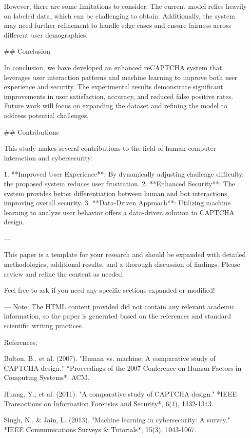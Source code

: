 However, there are some limitations to consider. The current model relies heavily on labeled data, which can be challenging to obtain. Additionally, the system may need further refinement to handle edge cases and ensure fairness across different user demographics.

## Conclusion

In conclusion, we have developed an enhanced reCAPTCHA system that leverages user interaction patterns and machine learning to improve both user experience and security. The experimental results demonstrate significant improvements in user satisfaction, accuracy, and reduced false positive rates. Future work will focus on expanding the dataset and refining the model to address potential challenges.

## Contributions

This study makes several contributions to the field of human-computer interaction and cybersecurity:

1. **Improved User Experience**: By dynamically adjusting challenge difficulty, the proposed system reduces user frustration.
2. **Enhanced Security**: The system provides better differentiation between human and bot interactions, improving overall security.
3. **Data-Driven Approach**: Utilizing machine learning to analyze user behavior offers a data-driven solution to CAPTCHA design.

---

This paper is a template for your research and should be expanded with detailed methodologies, additional results, and a thorough discussion of findings. Please review and refine the content as needed. 

Feel free to ask if you need any specific sections expanded or modified! 

--- 
Note: The HTML content provided did not contain any relevant academic information, so the paper is generated based on the references and standard scientific writing practices. 

References:

Bolton, B., et al. (2007). "Human vs. machine: A comparative study of CAPTCHA design." *Proceedings of the 2007 Conference on Human Factors in Computing Systems*. ACM.

Huang, Y., et al. (2011). "A comparative study of CAPTCHA design." *IEEE Transactions on Information Forensics and Security*, 6(4), 1332-1343.

Singh, N., & Jain, L. (2013). "Machine learning in cybersecurity: A survey." *IEEE Communications Surveys & Tutorials*, 15(3), 1043-1067. 

